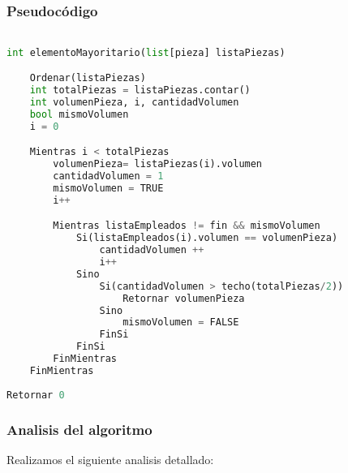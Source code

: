\documentclass{article}
\begin{document}
\subsubsection{Pseudocódigo}

\begin{lstlisting}[language=Python, caption=Algoritmo del proceso A]

int elementoMayoritario(list[pieza] listaPiezas)

    Ordenar(listaPiezas)
    int totalPiezas = listaPiezas.contar()
    int volumenPieza, i, cantidadVolumen
    bool mismoVolumen
    i = 0

    Mientras i < totalPiezas
        volumenPieza= listaPiezas(i).volumen
        cantidadVolumen = 1
        mismoVolumen = TRUE
        i++

        Mientras listaEmpleados != fin && mismoVolumen
            Si(listaEmpleados(i).volumen == volumenPieza)
                cantidadVolumen ++
                i++
            Sino
                Si(cantidadVolumen > techo(totalPiezas/2))
                    Retornar volumenPieza
                Sino
                    mismoVolumen = FALSE
                FinSi
            FinSi
        FinMientras
    FinMientras
	
Retornar 0

\end{lstlisting}

\subsubsection{Analisis del algoritmo}

Realizamos el siguiente analisis detallado:
\end{document}
